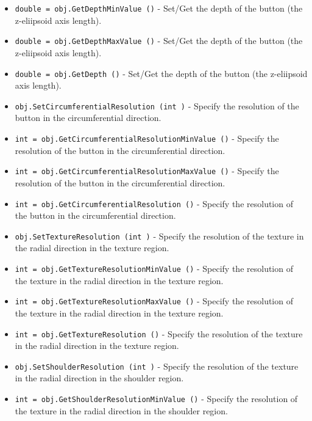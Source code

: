 \begin{itemize}
\item  \verb|double = obj.GetDepthMinValue ()| -  Set/Get the depth of the button (the z-eliipsoid axis length).

\item  \verb|double = obj.GetDepthMaxValue ()| -  Set/Get the depth of the button (the z-eliipsoid axis length).

\item  \verb|double = obj.GetDepth ()| -  Set/Get the depth of the button (the z-eliipsoid axis length).

\item  \verb|obj.SetCircumferentialResolution (int )| -  Specify the resolution of the button in the circumferential direction.

\item  \verb|int = obj.GetCircumferentialResolutionMinValue ()| -  Specify the resolution of the button in the circumferential direction.

\item  \verb|int = obj.GetCircumferentialResolutionMaxValue ()| -  Specify the resolution of the button in the circumferential direction.

\item  \verb|int = obj.GetCircumferentialResolution ()| -  Specify the resolution of the button in the circumferential direction.

\item  \verb|obj.SetTextureResolution (int )| -  Specify the resolution of the texture in the radial direction in the
 texture region.

\item  \verb|int = obj.GetTextureResolutionMinValue ()| -  Specify the resolution of the texture in the radial direction in the
 texture region.

\item  \verb|int = obj.GetTextureResolutionMaxValue ()| -  Specify the resolution of the texture in the radial direction in the
 texture region.

\item  \verb|int = obj.GetTextureResolution ()| -  Specify the resolution of the texture in the radial direction in the
 texture region.

\item  \verb|obj.SetShoulderResolution (int )| -  Specify the resolution of the texture in the radial direction in the
 shoulder region.

\item  \verb|int = obj.GetShoulderResolutionMinValue ()| -  Specify the resolution of the texture in the radial direction in the
 shoulder region.


\end{itemize}
